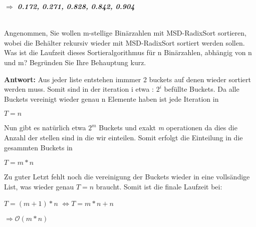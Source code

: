 \documentclass[12pt, a4paper, oneside]{article}
\begin{document}
\begin{description}
	\textbf{$\Longrightarrow$ \emph{0.172, 0.271, 0.828, 0.842, 0.904}}
	\newline
	
	\item[c)] \hfill \\
	Angenommen, Sie wollen m-stellige Binärzahlen mit MSD-RadixSort sortieren, wobei
	die Behälter rekursiv wieder mit MSD-RadixSort sortiert werden sollen. Was ist die
	Laufzeit dieses Sortieralgorithmus für n Binärzahlen, abhängig von n und m? Begründen
	Sie Ihre Behauptung kurz.
	\newline
	
	
	\textbf{Antwort:}
	\newline
	Aus jeder liste entstehen immmer 2 buckets auf denen wieder sortiert werden muss.
	Somit sind in der iteration i etwa : \(2^i\)  befüllte Buckets.
	Da alle Buckets vereinigt wieder genau n Elemente haben ist jede Iteration in
	\begin{center}
		\(T = n\)
	\end{center} 
	Nun gibt es natürlich etwa \(2^m\) Buckets und exakt \emph{m} operationen da dies die Anzahl der stellen sind in die wir einteilen.
	Somit erfolgt die Einteilung in die gesammten Buckets in
	\begin{center}
		 \(T = m*n\)
	\end{center}
	Zu guter Letzt fehlt noch die vereinigung der Buckets wieder in eine vollsändige List, was wieder genau \(T = n\)
	braucht. 
	Somit ist die finale Laufzeit bei:
	\begin{center}
		\item\(T = (m+1)*n \) \(\Longleftrightarrow T = m*n + n\)
		\item \emph{\( \Longrightarrow \mathcal{O}(m*n) \)}\\
	\end{center}
	\end{description}
	
\end{document}
